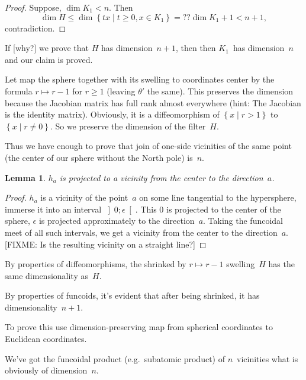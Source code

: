 \documentclass{amsart}
\newcommand{\setcond}[2]{\left\{#1\mid#2\right\}}
\newenvironment{del}{\color{gray}}{}
\newtheorem{lem}{Lemma}
\begin{document}
\begin{proof}
Suppose, $\dim K_1<n$. Then \[ \dim H\leq\dim\setcond{tx}{t\geq 0,x\in K_1} =?? \dim K_1+1<n+1, \] contradiction.
\end{proof}

If [why?] we prove that $H$ has dimension~$n+1$, then then $K_1$~has dimension~$n$ and our claim is proved.

Let map the sphere together with its swelling to coordinates center by the formula $r\mapsto r-1$ for $r\geq 1$ (leaving $\theta'$ the same).
This preserves the dimension because the Jacobian matrix has full rank almost everywhere (hint: The Jacobian is the identity matrix).
Obviously, it is a diffeomorphism of $\setcond{x}{r>1}$ to $\setcond{x}{r\ne 0}$. So we preserve the dimension of the filter~$H$.

Thus we have enough to prove that join of one-si\-de vicinities of the same point (the center of our sphere without the North pole) is~$n$.

\begin{lem}
$h_a$ is projected to a vicinity from the center to the direction~$a$.
\end{lem}

\begin{proof}
$h_a$ is a vicinity of the point~$a$ on some line tangential to the hypersphere, immerse it into an interval $\left]0;\epsilon\right[$. This $0$ is projected to the center of the sphere, $\epsilon$ is projected approximately to the direction~$a$. Taking the funcoidal meet of all such intervals, we get a vicinity from the center to the direction~$a$. [FIXME: Is the resulting vicinity on a straight line?]
\end{proof}

By properties of diffeomorphisms, the shrinked by $r\mapsto r-1$ swelling~$H$ has the same dimensionality as~$H$.

By properties of funcoids, it's evident that after being shrinked, it has dimensionality~$n+1$.

\begin{del}
To prove this use di\-men\-si\-on-pre\-ser\-ving map from spherical coordinates to Euclidean coordinates.

We've got the funcoidal product (e.g.\ subatomic product) of $n$\ vicinities what is obviously of dimension~$n$.
\end{del}



\end{document}
